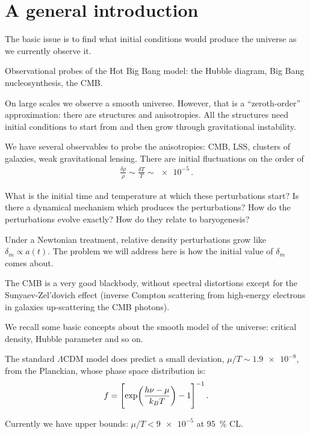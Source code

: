 \documentclass[main.tex]{subfiles}
\begin{document}
\section{A general introduction}

The basic issue is to find what initial conditions would produce the universe as we currently observe it.

Observational probes of the Hot Big Bang model: the Hubble diagram, Big Bang nucleosynthesis, the CMB. 

On large scales we observe a smooth universe. However, that is a ``zeroth-order'' approximation: there are structures and anisotropies. 
All the structures need initial conditions to start from and then grow through gravitational instability. 

We have several observables to probe the anisotropies: CMB, LSS, clusters of galaxies, weak gravitational lensing. 
There are initial fluctuations on the order of 
%
\begin{align}
\frac{ \delta \rho }{\rho } \sim \frac{ \delta T}{T} \sim \num{e-5}
\,.
\end{align}

What is the initial time and temperature at which these perturbations start? Is there a dynamical mechanism which produces the perturbations? 
How do the perturbations evolve exactly? 
How do they relate to baryogenesis?

Under a Newtonian treatment, relative density perturbations grow like \(\delta _m \propto a(t)\). 
The problem we will address here is how the initial value of \(\delta _m\) comes about. 

The CMB is a very good blackbody, without spectral distortions except for the Sunyaev-Zel'dovich effect (inverse Compton scattering from high-energy electrons in galaxies up-scattering the CMB photons). 

We recall some basic concepts about the smooth model of the universe: critical density, Hubble parameter and so on. 

The standard \(\Lambda \)CDM model does predict a small deviation, \(\mu / T \sim \num{1.9e-8}\), from the Planckian, whose phase space distribution is: 
%
\begin{align}
f = \qty[\exp(\frac{h \nu - \mu }{k_B T}) - 1]^{-1}
\,.
\end{align}

Currently we have upper bounds: \(\mu / T < \num{9e-5}\) at \SI{95}{\percent} CL. 
\end{document}
